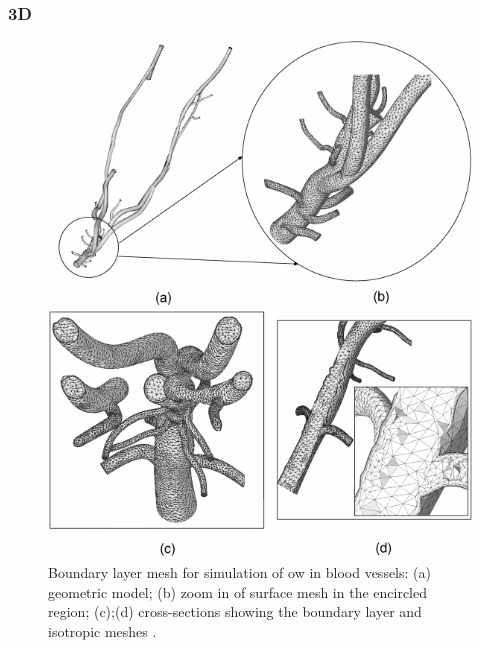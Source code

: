 \subsubsection{3D}
\label{sec-3D}

\begin{figure}
\begin{minipage}{0.45\linewidth}
	\centering
	\includegraphics[width=\linewidth]{img/intro/lit/shephard.png}
	\caption{Boundary layer mesh for simulation of ow in blood vessels: (a) geometric model; (b) zoom in of surface mesh in the encircled region; (c);(d) cross-sections showing the boundary layer and isotropic meshes \cite{garimella2000boundary}.}
	\label{fig-shephard}
\end{minipage}\hfill
\begin{minipage}{0.45\linewidth}
	\centering

\end{minipage}
\end{figure}
